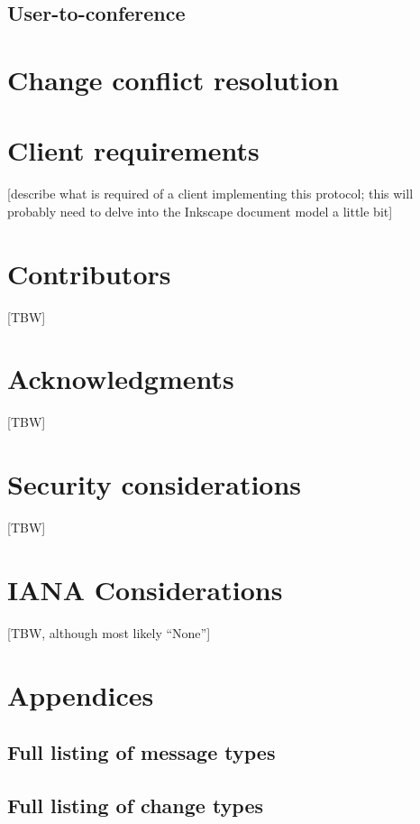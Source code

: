 \documentclass[11pt]{article}
\begin{document}
\subsection{User-to-conference}

\section{Change conflict resolution}

\section{Client requirements}
[describe what is required of a client implementing this protocol; this will probably need to delve into the Inkscape document model a little bit]

\section{Contributors}
[TBW]

\section{Acknowledgments}
[TBW]

\section{Security considerations}
[TBW]

\section{IANA Considerations}
[TBW, although most likely ``None'']

\appendix
\section{Appendices}

\subsection{Full listing of message types}
\label{message-types}

\subsection{Full listing of change types}
\label{change-types}



\end{document}
